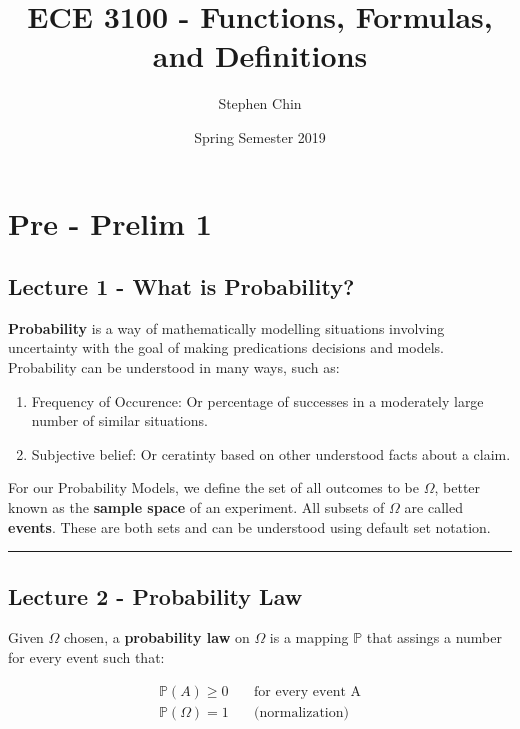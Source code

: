 \documentclass{article}
\title{ECE 3100 - Functions, Formulas, and Definitions}
\author{Stephen Chin}
\date{Spring Semester 2019}
\begin{document}
\maketitle
\tableofcontents
\newpage

\section{Pre - Prelim 1}

\subsection{Lecture 1 - What is Probability?}

\textbf{Probability} is a way of mathematically modelling situations
involving uncertainty with the goal of making predications decisions
and models. Probability can be understood in many ways, such as:

\begin{enumerate}
\item Frequency of Occurence: Or percentage of successes in a
  moderately large number of similar situations.
  
\item Subjective belief: Or ceratinty based on other understood facts
  about a claim.
\end{enumerate}

For our Probability Models, we define the set of all outcomes to be
$\Omega$, better known as the \textbf{sample space} of an
experiment. All subsets of $\Omega$ are called \textbf{events}. These
are both sets and can be understood using default set notation.


\medskip \hrule
\subsection{Lecture 2 - Probability Law}

Given $\Omega$ chosen, a \textbf{probability law} on $\Omega$ is a
mapping $\mathbb{P}$ that assings a number for every event such that:

\begin{equation} \tag{Kolmogorov's Axioms} \boxed{
    \begin{aligned} \mathbb{P}(A) \ge 0 & \quad \text{for every event
        A} \\ \mathbb{P}(\Omega) = 1 & \quad \text{(normalization)}
    \end{aligned} }
\end{equation}
\end{document}
